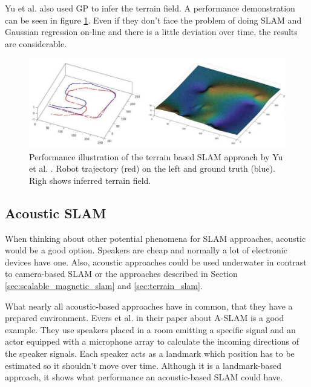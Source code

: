 Yu et al. also used GP to infer the terrain field. A performance demonstration can be seen in figure \ref{fig:yu_performance}. Even if they don't face the problem of doing SLAM and Gaussian regression on-line and there is a little deviation over time, the results are considerable.


\begin{figure}[h!]
	\centering
	\includegraphics[width=\textwidth]{images/yu_performance.png}
	\caption{
		Performance illustration of the terrain based SLAM approach by Yu et al. \cite{yu_terrain_2018}.
		Robot trajectory (red) on the left and ground truth (blue). Righ shows inferred terrain field.
	}
	\label{fig:yu_performance}
\end{figure}

\subsection{Acoustic SLAM}
\label{sec:acoustic_slam}

When thinking about other potential phenomena for SLAM approaches, acoustic would be a good option. Speakers are cheap and normally a lot of electronic devices have one. Also, acoustic approaches could be used underwater in contrast to camera-based SLAM or the approaches described in Section \ref{sec:scalable_magnetic_slam} and \ref{sec:terrain_slam}.

What nearly all acoustic-based approaches have in common, that they have a prepared environment. Evers et al. in their paper about A-SLAM \cite{evers_aslam_2016} is a good example. They use speakers placed in a room emitting a specific signal and an actor equipped with a microphone array to calculate the incoming directions of the speaker signals. Each speaker acts as a landmark which position has to be estimated so it shouldn't move over time. Although it is a landmark-based approach, it shows what performance an acoustic-based SLAM could have.

